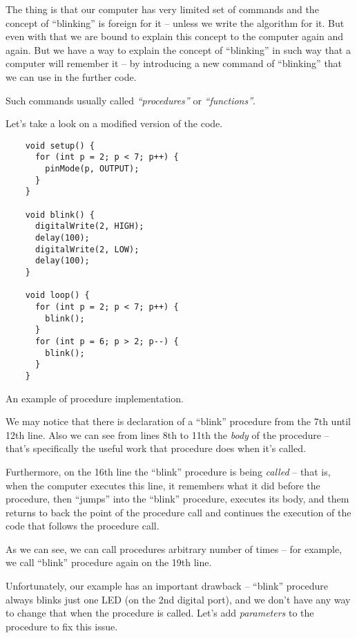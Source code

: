 \documentclass[../sparc.tex]{subfiles}
\begin{document}
The thing is that our computer has very limited set of commands and the concept
of ``blinking'' is foreign for it -- unless we write the algorithm for it.  But
even with that we are bound to explain this concept to the computer again and
again.  But we have a way to explain the concept of ``blinking'' in such way
that a computer will remember it -- by introducing a new command of ``blinking''
that we can use in the further code.

Such commands usually called \emph{``procedures''} or \emph{``functions''}.

Let's take a look on a modified version of the code.

\begin{listing}[H]
  \begin{verbatim}
    void setup() {
      for (int p = 2; p < 7; p++) {
        pinMode(p, OUTPUT);
      }
    }

    void blink() {
      digitalWrite(2, HIGH);
      delay(100);
      digitalWrite(2, LOW);
      delay(100);
    }

    void loop() {
      for (int p = 2; p < 7; p++) {
        blink();
      }
      for (int p = 6; p > 2; p--) {
        blink();
      }
    }
  \end{verbatim}
  \label{listing:procedure-example-1}
  \caption{An example of procedure implementation.}
\end{listing}

We may notice that there is declaration of a ``blink'' procedure from the 7th
until 12th line.  Also we can see from lines 8th to 11th the \emph{body} of the
procedure -- that's specifically the useful work that procedure does when it's
called.

Furthermore, on the 16th line the ``blink'' procedure is being \emph{called} --
that is, when the computer executes this line, it remembers what it did before
the procedure, then ``jumps'' into the ``blink'' procedure, executes its body,
and them returns to back the point of the procedure call and continues the
execution of the code that follows the procedure call.

As we can see, we can call procedures arbitrary number of times -- for example,
we call ``blink'' procedure again on the 19th line.

Unfortunately, our example has an important drawback -- ``blink'' procedure
always blinks just one LED (on the 2nd digital port), and we don't have any way
to change that when the procedure is called.  Let's add \emph{parameters} to the
procedure to fix this issue.
\end{document}
